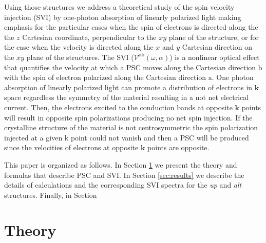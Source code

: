 \documentclass[prb,11pt,tightenlines,twocolumn,aps]{revtex4-1}
\begin{document}
{Using those structures we address a theoretical study of the spin velocity
injection (SVI) by one-photon absorption of linearly polarized light making
emphasis for the particular cases when the spin of electrons is directed along
the the $z$ Cartesian coordinate, perpendicular to the $xy$ plane of the
structure, or for the case when the velocity is directed along the $x$ and $y$
Cartesian direction on the $xy$ plane of the structures.
% 
The SVI ($\mathcal{V}^{\mathrm{ab}}(\omega,\alpha)$) is a nonlinear optical
effect that quantifies the velocity at which a PSC moves along the Cartesian
direction $\mathrm{b}$ with the spin of electron polarized along the Cartesian
direction $\mathrm{a}$. One photon absorption of linearly polarized light can
promote a distribution of electrons in $\mathbf{k}$ space regardless the
symmetry of the material resulting in a not net electrical
current. Then, the electrons excited to the conduction bands at
opposite $\mathbf{k}$ points will result in opposite spin polarizations 
producing no net spin injection.\cite{bhatPRL05} If the crystalline structure of
the material is not centrosymmetric the spin polarization injected at a given k
point could not vanish\cite{alvaradoPRL85, schmiedeskampPRL88} and then a PSC
will be produced since the velocities of electrons at opposite $\mathbf{k}$
points are opposite.

This paper is organized as follows. In Section \ref{sec:theory} we present the
theory and formulas that describe PSC and SVI. In Section \ref{sec:results} we
describe the details of calculations and the corresponding SVI spectra for the 
\emph{up} and \emph{alt} structures. Finally, in Section 


}


\section{Theory} %
\label{sec:theory}
\end{document}
